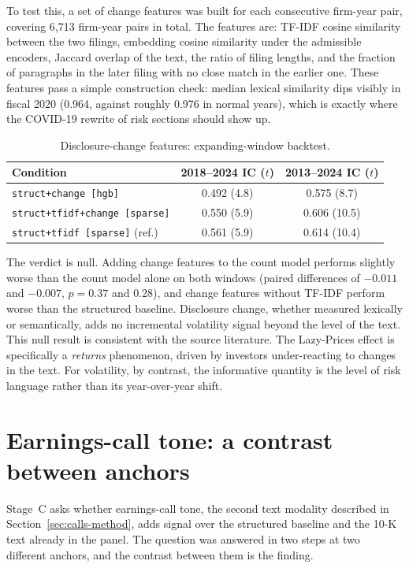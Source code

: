 \documentclass[logo,msc,ai]{infthesis}        %
\begin{document}
To test this, a set of change features was built for each consecutive firm-year pair, covering 6{,}713 firm-year pairs in total. The features are: TF-IDF cosine similarity between the two filings, embedding cosine similarity under the admissible encoders, Jaccard overlap of the text, the ratio of filing lengths, and the fraction of paragraphs in the later filing with no close match in the earlier one. These features pass a simple construction check: median lexical similarity dips visibly in fiscal 2020 (0.964, against roughly 0.976 in normal years), which is exactly where the COVID-19 rewrite of risk sections should show up.

\begin{table}[h]
\centering
\footnotesize
\caption{Disclosure-change features: expanding-window backtest.}
\label{tab:change}
\begin{tabular}{@{}L{5.6cm}cc@{}}
\toprule
\textbf{Condition} & \textbf{2018--2024 IC ($t$)} & \textbf{2013--2024 IC ($t$)} \\
\midrule
\texttt{struct+change [hgb]}         & 0.492 (4.8) & 0.575 (8.7) \\
\texttt{struct+tfidf+change [sparse]} & 0.550 (5.9) & 0.606 (10.5) \\
\texttt{struct+tfidf [sparse]} (ref.) & 0.561 (5.9) & 0.614 (10.4) \\
\bottomrule
\end{tabular}
\end{table}

The verdict is null. Adding change features to the count model performs slightly worse than the count model alone on both windows (paired differences of $-0.011$ and $-0.007$, $p=0.37$ and $0.28$), and change features without TF-IDF perform worse than the structured baseline. Disclosure change, whether measured lexically or semantically, adds no incremental volatility signal beyond the level of the text. This null result is consistent with the source literature. The Lazy-Prices effect is specifically a \emph{returns} phenomenon, driven by investors under-reacting to changes in the text. For volatility, by contrast, the informative quantity is the level of risk language rather than its year-over-year shift.

\section{Earnings-call tone: a contrast between anchors}
\label{sec:results-calls}
Stage~C asks whether earnings-call tone, the second text modality described in Section~\ref{sec:calls-method}, adds signal over the structured baseline and the 10-K text already in the panel. The question was answered in two steps at two different anchors, and the contrast between them is the finding.
\end{document}

